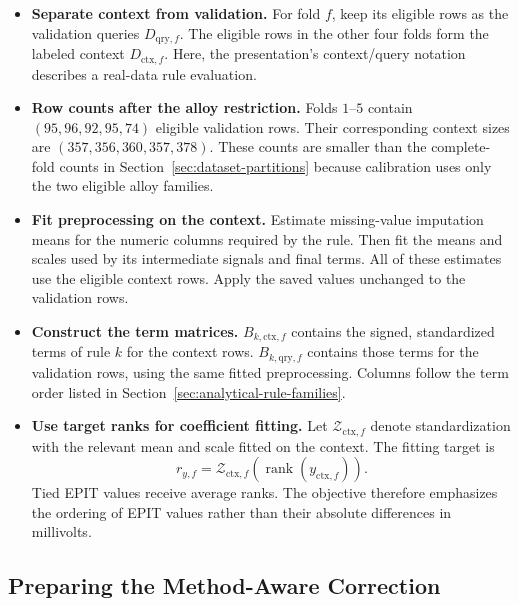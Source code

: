 \documentclass[11pt]{article}
\newenvironment{notes}
  {\begin{itemize}\setlength{\itemsep}{0.45em}\setlength{\parsep}{0pt}}
  {\end{itemize}}
\begin{document}
\begin{notes}
    \item \textbf{Separate context from validation.}
    For fold \(f\), keep its eligible rows as the validation
    queries \(D_{\mathrm{qry},f}\). The eligible rows in the
    other four folds form the labeled context
    \(D_{\mathrm{ctx},f}\).
    Here, the presentation's context/query notation describes
    a real-data rule evaluation.

    \item \textbf{Row counts after the alloy restriction.}
    Folds \(1\)--\(5\) contain
    \((95,96,92,95,74)\) eligible validation rows.
    Their corresponding context sizes are
    \((357,356,360,357,378)\).
    These counts are smaller than the complete-fold counts
    in Section~\ref{sec:dataset-partitions} because calibration
    uses only the two eligible alloy families.

    \item \textbf{Fit preprocessing on the context.}
    Estimate missing-value imputation means for the numeric
    columns required by the rule. Then fit the means and
    scales used by its intermediate signals and final terms.
    All of these estimates use the eligible context rows.
    Apply the saved values unchanged to the validation rows.

    \item \textbf{Construct the term matrices.}
    \(B_{k,\mathrm{ctx},f}\) contains the signed, standardized
    terms of rule \(k\) for the context rows.
    \(B_{k,\mathrm{qry},f}\) contains those terms for the
    validation rows, using the same fitted preprocessing.
    Columns follow the term order listed in
    Section~\ref{sec:analytical-rule-families}.

    \item \textbf{Use target ranks for coefficient fitting.}
    Let \(\mathcal{Z}_{\mathrm{ctx},f}\) denote standardization
    with the relevant mean and scale fitted on the context.
    The fitting target is
    \[
        r_{y,f}
        =
        \mathcal{Z}_{\mathrm{ctx},f}
        \!\left(\operatorname{rank}(y_{\mathrm{ctx},f})\right).
    \]
    Tied EPIT values receive average ranks.
    The objective therefore emphasizes the ordering of EPIT
    values rather than their absolute differences in millivolts.
\end{notes}

\subsection{Preparing the Method-Aware Correction}
\label{sec:method-calibration}
\end{document}
